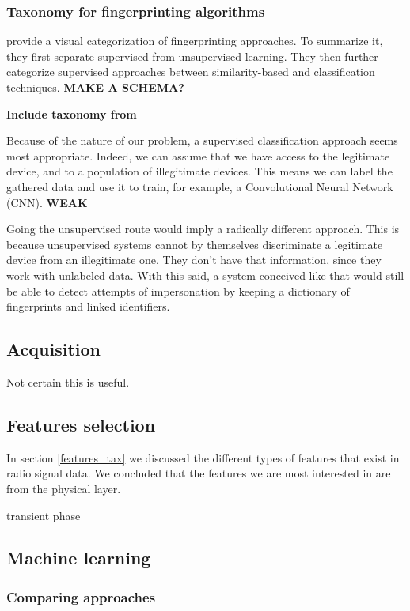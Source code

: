 \subsubsection{Taxonomy for fingerprinting algorithms}

\textcite{riyaz_deep_2018} provide a visual categorization of fingerprinting approaches. To summarize it, they first separate supervised from unsupervised learning. They then further categorize supervised approaches between similarity-based and classification techniques. \textbf{MAKE A SCHEMA?}

\textbf{Include taxonomy from} \textcite{xu_device_2015}

Because of the nature of our problem, a supervised classification approach seems most appropriate. Indeed, we can assume that we have access to the legitimate device, and to a population of illegitimate devices. This means we can label the gathered data and use it to train, for example, a Convolutional Neural Network (CNN). \textbf{WEAK}

Going the unsupervised route would imply a radically different approach. This is because unsupervised systems cannot by themselves discriminate a legitimate device from an illegitimate one. They don't have that information, since they work with unlabeled data. With this said, a system conceived like that would still be able to detect attempts of impersonation by keeping a dictionary of fingerprints and linked identifiers.

\subsection{Acquisition}

Not certain this is useful.

\subsection{Features selection}

In section \ref{features_tax} we discussed the different types of features that exist in radio signal data. We concluded that the features we are most interested in are from the physical layer.

transient phase

\subsection{Machine learning}

\subsubsection{Comparing approaches}

